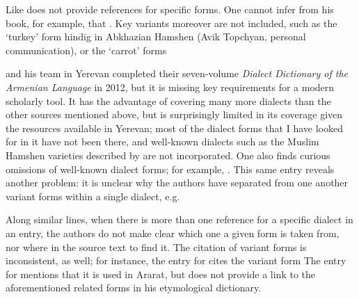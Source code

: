 Like  does not provide references for specific forms. One cannot infer from his book, for example, that . Key variants moreover are not included, such as the `turkey' form hindig in Abkhazian Hamshen (Avik Topchyan, personal communication), or the `carrot' forms

 and his team in Yerevan completed their seven-volume \textit{Dialect Dictionary of the Armenian Language} in 2012, but it is missing key requirements for a modern scholarly tool. It has the advantage of covering many more dialects than the other sources mentioned above, but is surprisingly limited in its coverage given the resources available in Yerevan; most of the dialect forms that I have looked for in it have not been there, and well-known dialects such as the Muslim Hamshen varieties described by  are not incorporated. One also finds curious omissions of well-known dialect forms; for example, . This same entry reveals another problem: it is unclear why the authors have separated from one another variant forms within a single dialect, e.g. 

Along similar lines, when there is more than one reference for a specific dialect in an entry, the authors do not make clear which one a given form is taken from, nor where in the source text to find it. The citation of variant forms is inconsistent, as well; for instance, the entry for  cites the variant form  The entry for  mentions that it is used in Ararat, but does not provide a link to the aforementioned related forms  in his etymological dictionary.

